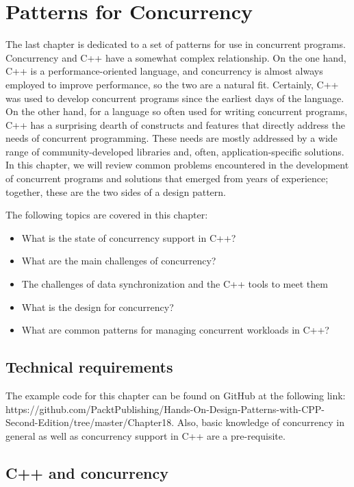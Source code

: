 ﻿\chapter{Patterns for Concurrency}

The last chapter is dedicated to a set of patterns for use in concurrent programs. Concurrency and C++ have a somewhat complex relationship. On the one hand, C++ is a performance-oriented language, and concurrency is almost always employed to improve performance, so the two are a natural fit. Certainly, C++ was used to develop concurrent programs since the earliest days of the language. On the other hand, for a language so often used for writing concurrent programs, C++ has a surprising dearth of constructs and features that directly address the needs of concurrent programming. These needs are mostly addressed by a wide range of community-developed libraries and, often, application-specific solutions. In this chapter, we will review common problems encountered in the development of concurrent programs and solutions that emerged from years of experience; together, these are the two sides of a design pattern.

The following topics are covered in this chapter:

\begin{itemize}
\item
  What is the state of concurrency support in C++?
\item
  What are the main challenges of concurrency?
\item
  The challenges of data synchronization and the C++ tools to meet them
\item
  What is the design for concurrency?
\item
  What are common patterns for managing concurrent workloads in C++?
\end{itemize}

\section{Technical requirements}

The example code for this chapter can be found on GitHub at the following link: https://github.com/PacktPublishing/Hands-On-Design-Patterns-with-CPP-Second-Edition/tree/master/Chapter18. Also, basic knowledge of concurrency in general as well as concurrency support in C++ are a pre-requisite.

\section{C++ and concurrency}

